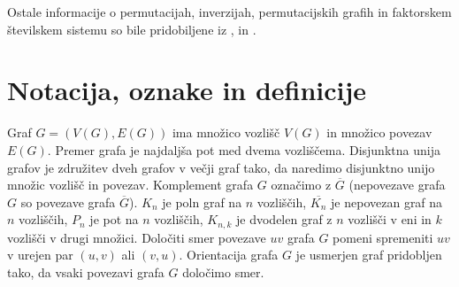 \documentclass[a4paper, 12pt]{book}
\begin{document}
Ostale informacije o permutacijah, inverzijah, permutacijskih grafih in faktorskem številskem sistemu so bile pridobiljene iz \cite{dsSkripta}, \cite{inversionCoding} in \cite{factorialNumberSystem}.



\section{ Notacija, oznake in definicije }

Graf $G = (V(G), E(G))$ ima množico vozlišč $V(G)$ in množico povezav $E(G)$. Premer grafa je najdaljša pot med dvema vozliščema. Disjunktna unija grafov je združitev dveh grafov v večji graf tako, da naredimo disjunktno unijo množic vozlišč in povezav. Komplement grafa $G$ označimo z $\overline{G}$ (nepovezave grafa $G$ so povezave grafa $\overline{G}$). $K_n$ je poln graf na $n$ vozliščih, $\overline{K_n}$ je nepovezan graf na $n$ vozliščih, $P_n$ je pot na $n$ vozliščih, $K_{n, k}$ je dvodelen graf z $n$ vozlišči v eni in $k$ vozlišči v drugi množici. Določiti smer povezave $uv$ grafa $G$ pomeni spremeniti $uv$ v urejen par $(u, v)$ ali $(v, u)$. Orientacija grafa $G$ je usmerjen graf pridobljen tako, da vsaki povezavi grafa $G$ določimo smer.
\end{document}
